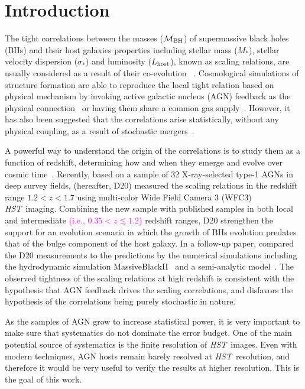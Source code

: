 \documentclass[fleqn,usenatbib]{mnras}
\newcommand{\hst}{{\it HST}}
\newcommand{\mbh}{$\mathcal M_{\rm BH}$}
\newcommand{\lhost}{$L_{\rm host}$}
\newcommand{\mstar}{{$M_*$}}
\newcommand{\pink}[1]{{\textcolor{magenta}{#1}}}
\begin{document}
\section{Introduction}
The tight correlations between the masses (\mbh) of supermassive black holes (BHs) and their host galaxies properties including stellar mass (\mstar), stellar velocity dispersion ($\sigma_*$) and luminosity (\lhost), known as scaling relations, are usually considered as a result of their co-evolution ~\citep[e.g.,][]{Mag++98, F+M00, Geb++01b, M+H03, Gul++09,Beifi2012, H+R04, Gra++2011}. Cosmological simulations of structure formation are able to reproduce the local tight relation based on physical mechanism by invoking active galactic nucleus (AGN) feedback as the physical connection~\citep{Springel2005, Hopkins2008, Matteo2008, DeG++15} or having them share a common gas supply~\citep{Cen2015, Menci2016}. However, it has also been suggested that the correlations arise statistically, without any physical coupling, as a result of stochastic mergers~\citep{Peng2007, Jahnke2011, Hirschmann2010}. 

A powerful way to understand the origin of the correlations is to study them as a function of redshift, determining how and when they emerge and evolve over cosmic time~\citep[e.g.,][]{TMB04,Sal++06,Woo++06, Jah++09,SS13,Sun2015, Park15}. Recently, based on a sample of 32 X-ray-selected type-1 AGNs in deep survey fields, \citet{Ding2020a} (hereafter, D20) measured the scaling relations in the redshift range $1.2<z<1.7$ using multi-color Wide Field Camera 3 (WFC3) \hst\ imaging. Combining the new sample with published samples in both local and intermediate \pink{(i.e., $0.35<z\lesssim1.2$)} redshift ranges, D20 strengthen the support for an evolution scenario in which the growth of BHs evolution predates that of  the bulge component of the host galaxy. In a follow-up paper, \citet{Ding2020b} compared the D20 measurements to the predictions by the numerical simulations including the hydrodynamic simulation MassiveBlackII~\citep{Khandai2015} and a semi-analytic model~\citep{Menci2014}. The observed tightness of the  scaling relations at high redshift is consistent with the hypothesis that AGN feedback drives the scaling correlations, and disfavors the hypothesis of the correlations being purely stochastic in nature. 

As the samples of AGN grow to increase statistical power, it is very important to make sure that systematics do not dominate the error budget. One of the main potential source of systematics is the finite resolution of \hst\ images. Even with modern techniques, AGN hosts remain barely resolved at \hst\ resolution, and therefore it would be very useful to verify the results at higher resolution. This is the goal of this work.
\end{document}

